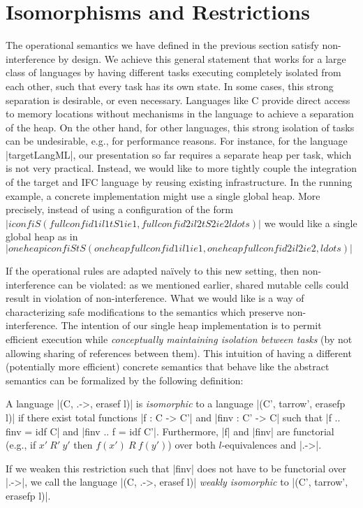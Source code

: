 \section{Isomorphisms and Restrictions}
\label{sec:concrete}

\newcommand{\con}[1]{\ensuremath{{\color{red} #1}}}
\newcommand{\abs}[1]{\ensuremath{{\color{blue} #1}}}

The operational semantics we have defined in the previous section
satisfy non-interference by design.
We achieve this general statement that works for a large class of
languages by having different tasks executing completely isolated from
each other, such that every task has its own state.
In some cases, this strong separation is desirable, or even necessary.
Languages like C provide direct access to memory locations without
mechanisms in the language to achieve a separation of the heap.
On the other hand, for other languages, this
strong isolation of tasks can be
undesirable, e.g., for performance reasons.
For instance, for the language |targetLangML|, our presentation so far
requires a separate heap per task, which is not very practical.
Instead, we would like to
more tightly couple the integration of the target and IFC
language by reusing existing infrastructure.  In the running example,
a concrete implementation might use a single global heap.
More precisely, instead of using a configuration of the form
$|iconf iS (fullconf id1 il1 tS1 ie1, fullconf id2 il2 tS2 ie2 ldots)|$
we would like a single global heap as in
$|oneheapiconf iS tS (oneheapfullconf id1 il1 ie1, oneheapfullconf id2 il2 ie2, ldots)|$

If the operational rules are adapted na\"ively to this new setting,
then non-interference can be violated: as we mentioned earlier,
shared mutable cells could result in violation of non-interference.
What we would like is a way of characterizing safe modifications to
the semantics which preserve non-interference.
The intention of our single heap implementation is to permit
efficient execution while \emph{conceptually maintaining isolation between
tasks} (by not allowing sharing of references between them).
This intuition of having a different (potentially more efficient)
concrete semantics that behave like the abstract semantics
can be formalized by the following definition:


\begin{definition}
  A language |(C, .->, erasef l)| is \textit{isomorphic} to a
  language |(C', tarrow', erasefp l)| if there exist total functions |f
  : C -> C'| and |finv : C' -> C| such that |f .. finv = idf C| and |finv
  .. f = idf C'|.  Furthermore, |f| and |finv| are functorial (e.g., if
  $x'\ R'\ y'$ then $f(x')\ R\ f(y')$) over both
  $l$-equivalences and |.->|.

  If we weaken this restriction such that |finv| does
  not have to be functorial over |.->|, we call the
  language |(C, .->, erasef l)| \textit{weakly isomorphic} to
  |(C', tarrow', erasefp l)|.
\end{definition}

